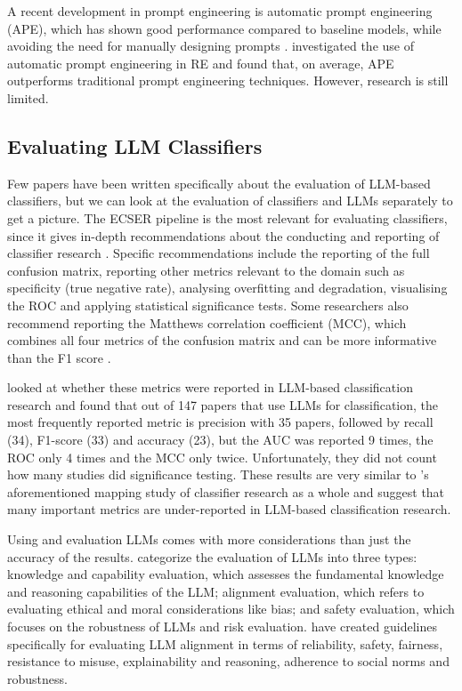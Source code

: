 \documentclass[a4paper]{article}
\begin{document}
A recent development in prompt engineering is automatic prompt engineering (APE), which has shown good performance compared to baseline models, while avoiding the need for manually designing prompts \cite{zhou2023ape,ye2024ape}. \textcite{zadenoori2025} investigated the use of automatic prompt engineering in RE and found that, on average, APE outperforms traditional prompt engineering techniques. However, research is still limited.

\subsection{Evaluating LLM Classifiers} \label{Evaluation of LLM Classifiers}
Few papers have been written specifically about the evaluation of LLM-based classifiers, but we can look at the evaluation of classifiers and LLMs separately to get a picture. The ECSER pipeline is the most relevant for evaluating classifiers, since it gives in-depth recommendations about the conducting and reporting of classifier research \cite{Dellanna2022}. Specific recommendations include the reporting of the full confusion matrix, reporting other metrics relevant to the domain such as specificity (true negative rate), analysing overfitting and degradation, visualising the ROC and applying statistical significance tests. Some researchers also recommend reporting the Matthews correlation coefficient (MCC), which combines all four metrics of the confusion matrix and can be more informative than the F1 score \cite{Chicco2020,Foody2023,Yao2020}. 

\textcite{hou2024} looked at whether these metrics were reported in LLM-based classification research and found that out of 147 papers that use LLMs for classification, the most frequently reported metric is precision with 35 papers, followed by recall (34), F1-score (33) and accuracy (23), but the AUC was reported 9 times, the ROC only 4 times and the MCC only twice. Unfortunately, they did not count how many studies did significance testing. These results are very similar to \textcite{Dellanna2022}'s aforementioned mapping study of classifier research as a whole and suggest that many important metrics are under-reported in LLM-based classification research. 

Using and evaluation LLMs comes with more considerations than just the accuracy of the results. \textcite{guo2023survey} categorize the evaluation of LLMs into three types: knowledge and capability evaluation, which assesses the fundamental knowledge and reasoning capabilities of the LLM; alignment evaluation, which refers to evaluating ethical and moral considerations like bias; and safety evaluation, which focuses on the robustness of LLMs and risk evaluation. \textcite{liu2024} have created guidelines specifically for evaluating LLM alignment in terms of reliability, safety, fairness, resistance to misuse, explainability and reasoning, adherence to social norms and robustness. 
\end{document}
